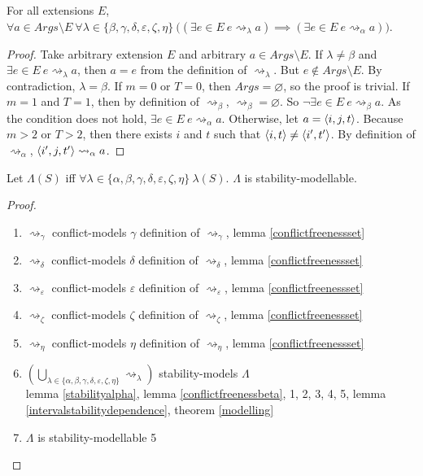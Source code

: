 \begin{lemma}
	\label{intervalstabilitydependence}
	For all extensions $E$, $\forall a\in Args\setminus E\ \forall\lambda\in\{\beta,\gamma,\delta,\varepsilon,\zeta,\eta\}\ \big((\exists e\in E\ e\rightsquigarrow_\lambda a)\implies(\exists e\in E\ e\rightsquigarrow_\alpha a)\big)$.
	
	\begin{proof}
		Take arbitrary extension $E$ and arbitrary $a\in Args\setminus E$. If $\lambda\neq\beta$ and $\exists e\in E\ e\rightsquigarrow_\lambda a$, then $a=e$ from the definition of $\rightsquigarrow_\lambda$. But $e\not\in Args\setminus E$. By contradiction, $\lambda=\beta$.
		\linespace
		If $m=0$ or $T=0$, then $Args=\varnothing$, so the proof is trivial.
		\linespace
		If $m=1$ and $T=1$, then by definition of $\rightsquigarrow_\beta$, $\rightsquigarrow_\beta=\varnothing$. So $\neg\exists e\in E\ e\rightsquigarrow_\beta a$. As the condition does not hold, $\exists e\in E\ e\rightsquigarrow_\alpha a$.
		\linespace
		Otherwise, let $a=\langle{i},{j},{t}\rangle$. Because $m>2$ or $T>2$, then there exists $i$ and $t$ such that $\langle{i},{t}\rangle\neq\langle{i'},{t'}\rangle$. By definition of $\rightsquigarrow_\alpha$, $\langle{i'},{j},{t'}\rangle\rightsquigarrow_\alpha a$.
	\end{proof}
\end{lemma}

\begin{theorem}
	Let $\Lambda(S)$ iff $\forall\lambda\in\{\alpha,\beta,\gamma,\delta,\varepsilon,\zeta,\eta\}\ \lambda(S)$. $\Lambda$ is stability-modellable.
	
	\begin{proof}\ 
		\begin{enumerate}
			\item $\rightsquigarrow_\gamma$ conflict-models $\gamma$ \hfill definition of $\rightsquigarrow_\gamma$, lemma \ref{conflictfreenessset}
			\item $\rightsquigarrow_\delta$ conflict-models $\delta$ \hfill definition of $\rightsquigarrow_\delta$, lemma \ref{conflictfreenessset}
			\item $\rightsquigarrow_\varepsilon$ conflict-models $\varepsilon$ \hfill definition of $\rightsquigarrow_\varepsilon$, lemma \ref{conflictfreenessset}
			\item $\rightsquigarrow_\zeta$ conflict-models $\zeta$ \hfill definition of $\rightsquigarrow_\zeta$, lemma \ref{conflictfreenessset}
			\item $\rightsquigarrow_\eta$ conflict-models $\eta$ \hfill definition of $\rightsquigarrow_\eta$, lemma \ref{conflictfreenessset}
			\item $\left(\bigcup_{\lambda\in\{\alpha,\beta,\gamma,\delta,\varepsilon,\zeta,\eta\}}\rightsquigarrow_\lambda\right)$ stability-models $\Lambda$\\\indent\hfill lemma \ref{stabilityalpha}, lemma \ref{conflictfreenessbeta}, 1, 2, 3, 4, 5, lemma \ref{intervalstabilitydependence}, theorem \ref{modelling}
			\item $\Lambda$ is stability-modellable \hfill 5
		\end{enumerate}
	\end{proof}
\end{theorem}